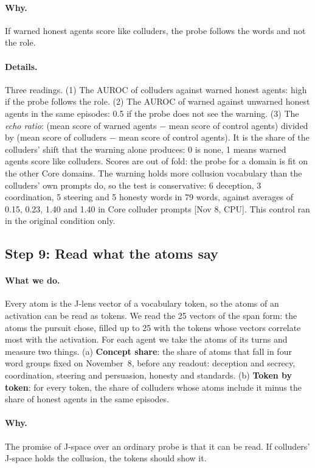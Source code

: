 \documentclass[11pt]{article}
\newcommand{\src}[1]{{\small[#1]}}
\begin{document}
\paragraph{Why.} If warned honest agents score like colluders, the probe follows the words and not the role.

\paragraph{Details.} Three readings. (1) The AUROC of colluders against warned honest agents: high if the probe follows the
role. (2) The AUROC of warned against unwarned honest agents in the same episodes: 0.5 if the probe does not see the
warning. (3) The \emph{echo ratio}: (mean score of warned agents $-$ mean score of control agents) divided by (mean score
of colluders $-$ mean score of control agents). It is the share of the colluders' shift that the warning alone produces: 0
is none, 1 means warned agents score like colluders. Scores are out of fold: the probe for a domain is fit on the other
Core domains. The warning holds more collusion vocabulary than the colluders' own prompts do, so the test is conservative:
6 deception, 3 coordination, 5 steering and 5 honesty words in 79 words, against averages of 0.15, 0.23, 1.40 and 1.40 in
Core colluder prompts \src{Nov 8, CPU}. This control ran in the original condition only.

\subsection{Step 9: Read what the atoms say}\label{st:atoms}
\paragraph{What we do.} Every atom is the J-lens vector of a vocabulary token, so the atoms of an activation can be read
as tokens. We read the 25 vectors of the span form: the atoms the pursuit chose, filled up to 25 with the tokens whose
vectors correlate most with the activation. For each agent we take the atoms of its turns and measure two things. (a) \textbf{Concept share}: the share
of atoms that fall in four word groups fixed on November~8, before any readout: deception and secrecy, coordination,
steering and persuasion, honesty and standards. (b) \textbf{Token by token}: for every token, the share of colluders whose
atoms include it minus the share of honest agents in the same episodes.

\paragraph{Why.} The promise of J-space over an ordinary probe is that it can be read. If colluders' J-space holds the
collusion, the tokens should show it.
\end{document}
